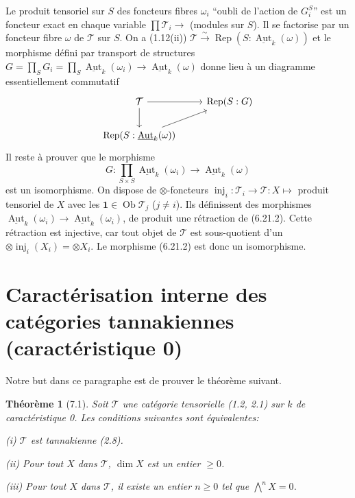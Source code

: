 \documentclass[12pt,a4paper]{article}
\theoremstyle{plain}
\newtheorem{theorem}{Théorème}[section]
\theoremstyle{definition}
\DeclareMathOperator{\Aut}{Aut}
\DeclareMathOperator{\Rep}{Rep}
\DeclareMathOperator{\inj}{inj}
\DeclareMathOperator{\Ob}{Ob}
\begin{document}
Le produit tensoriel sur $S$ des foncteurs fibres $\omega_i$ ``oubli de l'action de $G_i^S$'' est un foncteur exact en chaque variable $\prod \mathcal{T}_i \to$ (modules sur $S$). Il se factorise par un foncteur fibre $\omega$ de $\mathcal{T}$ sur $S$. On a (1.12(ii)) $\mathcal{T} \xrightarrow{\sim} \Rep(S : \underline{\Aut}_k(\omega))$ et le morphisme défini par transport de structures $G = \prod_S G_i = \prod_S \underline{\Aut}_k(\omega_i) \to \underline{\Aut}_k(\omega)$ donne lieu à un diagramme essentiellement commutatif
\[
\begin{tikzcd}
\mathcal{T} \arrow[r] \arrow[d] & \Rep(S : G) \\
\Rep(S : \underline{\Aut}_k(\omega)) \arrow[ur]
\end{tikzcd}
\]
Il reste à prouver que le morphisme
\begin{equation}\label{eq:6.21.2}
G : \prod_{S \times S} \underline{\Aut}_k(\omega_i) \to \underline{\Aut}_k(\omega)
\end{equation}
est un isomorphisme. On dispose de $\otimes$-foncteurs $\inj_i : \mathcal{T}_i \to \mathcal{T} : X \mapsto$ produit tensoriel de $X$ avec les $\mathbf{1} \in \Ob\mathcal{T}_j$ ($j \neq i$). Ils définissent des morphismes $\underline{\Aut}_k(\omega_i) \to \underline{\Aut}_k(\omega_i)$, de produit une rétraction de (6.21.2). Cette rétraction est injective, car tout objet de $\mathcal{T}$ est sous-quotient d'un $\otimes \inj_i(X_i) = \otimes X_i$. Le morphisme (6.21.2) est donc un isomorphisme.

\section{Caractérisation interne des catégories tannakiennes (caractéristique 0)}

Notre but dans ce paragraphe est de prouver le théorème suivant.

\begin{theorem}[7.1]\label{thm:7.1}
Soit $\mathcal{T}$ une catégorie tensorielle (1.2, 2.1) sur $k$ de caractéristique 0. Les conditions suivantes sont équivalentes:

\textup{(i)} $\mathcal{T}$ est tannakienne (2.8).

\textup{(ii)} Pour tout $X$ dans $\mathcal{T}$, $\dim X$ est un entier $\geq 0$.

\textup{(iii)} Pour tout $X$ dans $\mathcal{T}$, il existe un entier $n \geq 0$ tel que $\bigwedge^n X = 0$.
\end{theorem}
\end{document}
